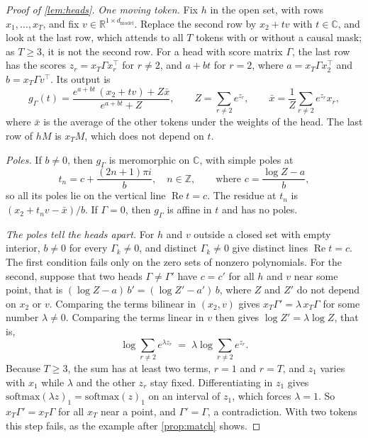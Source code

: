 \documentclass[10pt]{article}
\theoremstyle{definition}
\theoremstyle{remark}
\newcommand{\R}{\mathbb{R}}
\newcommand{\dm}{d_{\mathrm{model}}}
\begin{document}
\begin{proof}[Proof of \cref{lem:heads}]
\emph{One moving token.} Fix $h$ in the open set, with rows $x_1, \dots, x_T$, and fix $v \in \R^{1\times\dm}$. Replace the second row by $x_2 + tv$ with $t \in \mathbb{C}$, and look at the last row, which attends to all $T$ tokens with or without a causal mask; as $T \ge 3$, it is not the second row. For a head with score matrix $\Gamma$, the last row has the scores $z_r = x_T\Gamma x_r^\top$ for $r \neq 2$, and $a + bt$ for $r = 2$, where $a = x_T\Gamma x_2^\top$ and $b = x_T\Gamma v^\top$. Its output is
\[
g_\Gamma(t) = \frac{e^{a+bt}\,(x_2 + tv) + Z\bar x}{e^{a+bt} + Z}, \qquad Z = \sum_{r\neq 2} e^{z_r}, \qquad \bar x = \frac1Z\sum_{r\neq 2} e^{z_r}x_r,
\]
where $\bar x$ is the average of the other tokens under the weights of the head. The last row of $hM$ is $x_TM$, which does not depend on $t$.

\emph{Poles.} If $b \neq 0$, then $g_\Gamma$ is meromorphic on $\mathbb{C}$, with simple poles at
\[
t_n = c + \frac{(2n+1)\pi i}{b}, \quad n \in \mathbb{Z}, \qquad\text{where } c = \frac{\log Z - a}{b},
\]
so all its poles lie on the vertical line $\operatorname{Re} t = c$. The residue at $t_n$ is $(x_2 + t_nv - \bar x)/b$. If $\Gamma = 0$, then $g_\Gamma$ is affine in $t$ and has no poles.

\emph{The poles tell the heads apart.} For $h$ and $v$ outside a closed set with empty interior, $b \neq 0$ for every $\Gamma_k \neq 0$, and distinct $\Gamma_k \neq 0$ give distinct lines $\operatorname{Re} t = c$. The first condition fails only on the zero sets of nonzero polynomials. For the second, suppose that two heads $\Gamma \neq \Gamma'$ have $c = c'$ for all $h$ and $v$ near some point, that is $(\log Z - a)\,b' = (\log Z' - a')\,b$, where $Z$ and $Z'$ do not depend on $x_2$ or $v$. Comparing the terms bilinear in $(x_2, v)$ gives $x_T\Gamma' = \lambda\, x_T\Gamma$ for some number $\lambda \neq 0$. Comparing the terms linear in $v$ then gives $\log Z' = \lambda \log Z$, that is,
\[
\log \sum_{r\neq 2} e^{\lambda z_r} \;=\; \lambda \log \sum_{r\neq 2} e^{z_r}.
\]
Because $T \ge 3$, the sum has at least two terms, $r = 1$ and $r = T$, and $z_1$ varies with $x_1$ while $\lambda$ and the other $z_r$ stay fixed. Differentiating in $z_1$ gives $\mathrm{softmax}(\lambda z)_1 = \mathrm{softmax}(z)_1$ on an interval of $z_1$, which forces $\lambda = 1$. So $x_T\Gamma' = x_T\Gamma$ for all $x_T$ near a point, and $\Gamma' = \Gamma$, a contradiction. With two tokens this step fails, as the example after \cref{prop:match} shows.


\end{proof}
\end{document}
